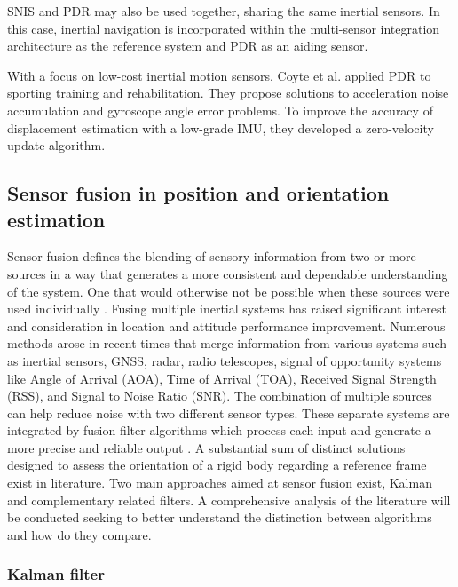 SNIS and PDR may also be used together, sharing the same inertial sensors. In this case, inertial navigation is incorporated within the multi-sensor integration architecture as the reference system and PDR as an aiding sensor.


With a focus on low-cost inertial motion sensors, Coyte et al. \cite{coyte2013displacement} applied PDR to sporting training and rehabilitation. They propose solutions to acceleration noise accumulation and gyroscope angle error problems. To improve the accuracy of displacement estimation with a low-grade IMU, they developed a zero-velocity update algorithm.

\subsection{Sensor fusion in position and orientation estimation }

Sensor fusion defines the blending of sensory information from two or more sources in a way that generates a more consistent and dependable understanding of the system. One that would otherwise not be possible when these sources were used individually \cite{hall1997introduction}. Fusing multiple inertial systems has raised significant interest and consideration in location and attitude performance improvement. Numerous methods arose in recent times that merge information from various systems such as inertial sensors, GNSS, radar, radio telescopes, signal of opportunity systems like Angle of Arrival (AOA), Time of Arrival (TOA), Received Signal Strength (RSS), and Signal to Noise Ratio (SNR). The combination of multiple sources can help reduce noise with two different sensor types. These separate systems are integrated by fusion filter algorithms which process each input and generate a more precise and reliable output \cite{elmenreich2002introduction}. A substantial sum of distinct solutions designed to assess the orientation of a rigid body regarding a reference frame exist in literature. Two main approaches aimed at sensor fusion exist, Kalman and complementary related filters. A comprehensive analysis of the literature will be conducted seeking to better understand the distinction between algorithms and how do they compare.

\subsubsection{Kalman filter}


